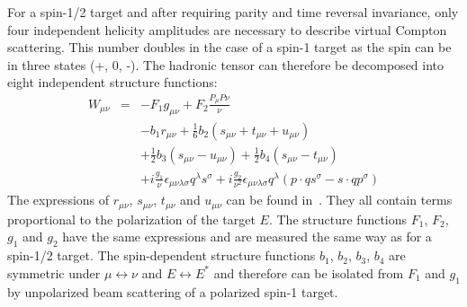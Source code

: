 For a spin-1/2 target and after requiring parity 
and time reversal invariance, only four independent helicity amplitudes are 
necessary to describe virtual Compton scattering. This number doubles in the case 
of a spin-1 target as the spin can be in three states (+, 0, -). The 
hadronic tensor can therefore be decomposed into eight independent structure 
functions:
%
\begin{eqnarray}
W_{\mu\nu} &=& - F_1 g_{\mu\nu} + F_2 \frac{P_{\mu} P{\nu}}{\nu} \nonumber \\
          & & - b_1 r_{\mu\nu} + \frac{1}{6} b_2 (s_{\mu\nu} + t_{\mu\nu} + u_{\mu\nu}) \nonumber \\
          & & + \frac{1}{2} b_3 (s_{\mu\nu} - u_{\mu\nu}) + \frac{1}{2} b_4 (s_{\mu\nu} - t_{\mu\nu}) \nonumber \\
          & & + i \frac{g_1}{\nu} \epsilon_{\mu\nu\lambda\sigma} q^{\lambda} s^{\sigma} 
              + i \frac{g_2}{\nu^2} \epsilon_{\mu\nu\lambda\sigma} q^{\lambda} (p \cdot qs^{\sigma}  
              - s \cdot qp^{\sigma})
\label{had-tensor}
\end{eqnarray}
%
The expressions of $r_{\mu\nu}$, $s_{\mu\nu}$, $t_{\mu\nu}$ and $u_{\mu\nu}$ can be 
found in~\cite{Hoodbhoy:1988am}. They all contain terms proportional to the 
polarization of the target $E$. The structure functions $F_1$, $F_2$, $g_1$ and 
$g_2$ have the same expressions and are measured the same way as for a spin-1/2 
target. The spin-dependent structure functions $b_1$, $b_2$, $b_3$, $b_4$ are 
symmetric under $\mu\leftrightarrow\nu$ and $E\leftrightarrow E^*$ and therefore can 
be isolated from $F_1$ and $g_1$ by unpolarized beam scattering of a polarized 
spin-1 target.
